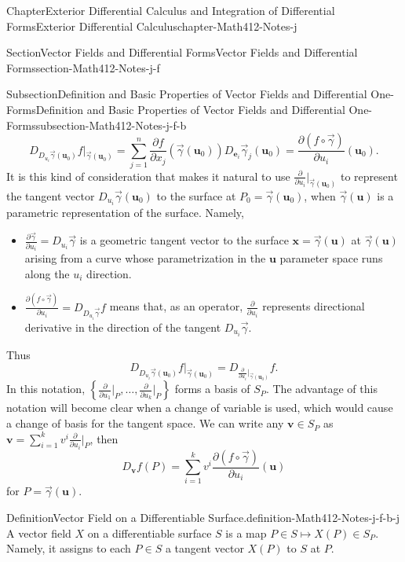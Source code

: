 \documentclass[oneside,10pt,]{book}
\numberwithin{equation}{section}
\newcommand{\be}{\mathbf{e}}
\newcommand{\bu}{\mathbf{u}}
\newcommand{\bv}{\mathbf{v}}
\newcommand{\bx}{\mathbf{x}}
\newcommand{\vg}{{\vec{\gamma}}}
\begin{document}
\begin{chapterptx}{Chapter}{Exterior Differential Calculus and Integration of Differential Forms}{}{Exterior Differential Calculus}{}{}{chapter-Math412-Notes-j}
\begin{sectionptx}{Section}{Vector Fields and Differential Forms}{}{Vector Fields and Differential Forms}{}{}{section-Math412-Notes-j-f}
\begin{subsectionptx}{Subsection}{Definition and Basic Properties of Vector Fields and Differential One-Forms}{}{Definition and Basic Properties of Vector Fields and Differential One-Forms}{}{}{subsection-Math412-Notes-j-f-b}
\begin{equation*}
D_{D_{u_{i}}\vg(\bu_0)} f \Big|_{\vg(\bu_0)}=\sum_{j=1}^{n}\frac{\partial f}{\partial x_{j}}(\vg(\bu_{0})) D_{\be_{i}}\vg_{j}(\bu_0)
=\frac{\partial \left( f\circ \vg\right) }{\partial u_{i}}(\bu_0).
\end{equation*}
It is this kind of consideration that makes it natural to use \(\frac{\partial  }{\partial u_{i}}\Big|_{\vg(\bu_0)}\) to represent the tangent vector \(D_{u_{i}}\vg(\bu_0)\) to the surface at \(P_{0}=\vg(\bu_0)\), when \(\vg(\bu)\) is a parametric representation of the surface. Namely,%
\begin{itemize}[label=\textbullet]
\item{}\(\frac{\partial \vg}{\partial u_{i}}=D_{u_{i}}\vg\) is a geometric tangent vector to the surface \(\bx=\vg(\bu)\) at \(\vg(\bu)\) arising from a curve whose parametrization in the \(\bu\) parameter space runs along the \(u_{i}\) direction.%
\item{}\(\frac{\partial (f\circ \vg)}{\partial u_{i}}=D_{D_{u_{i}}\vg}f\) means that,  as an operator, \(\frac{\partial }{\partial u_{i}}\) represents directional derivative in the direction of the tangent \(D_{u_{i}}\vg\).%
\end{itemize}
Thus%
\begin{equation*}
D_{D_{u_{i}}\vg(\bu_0)} f \Big|_{\vg(\bu_0)}=D_{\frac{\partial  }{\partial u_{i}}\Big|_{\vg(\bu_0)}}f .
\end{equation*}
In this notation, \(\left\{  \frac{\partial }{\partial u_{1}}\Big|_P, \ldots,  \frac{\partial }{\partial u_{k}}\Big|_P\right\}\) forms a basis of \(S_{P}\). The advantage of this notation will become clear when a change of variable is used, which would cause a change of basis for the tangent space. We can write any \(\bv\in S_{P}\) as \(\bv=\sum_{i=1}^{k}v^{i}\frac{\partial }{\partial u_{i}}\Big|_P\), then%
\begin{equation*}
D_{\bv}f (P)
=\sum_{i=1}^{k}v^{i}\frac{\partial (f\circ \vg)}{\partial u_{i}} (\bu)
\end{equation*}
for \(P=\vg(\bu)\).%
\begin{definition}{Definition}{Vector Field on a Differentiable Surface.}{definition-Math412-Notes-j-f-b-j}%
A vector field \(X\) on a differentiable surface \(S\) is a map \(P\in S\mapsto X(P)\in S_{P}\). Namely, it assigns to each \(P\in S\) a tangent vector \(X(P)\) to \(S\) at \(P\).%
\par

\end{definition}
\end{subsectionptx}
\end{sectionptx}
\end{chapterptx}
\end{document}
